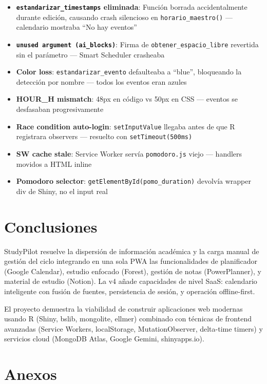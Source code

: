 \documentclass[
  spanish,
  11pt,
  a4paper,
]{article}
\providecommand{\tightlist}{%
  \setlength{\itemsep}{0pt}\setlength{\parskip}{0pt}}
\begin{document}
\begin{itemize}
\tightlist
\item
  \textbf{\texttt{estandarizar\_timestamps} eliminada}: Función borrada
  accidentalmente durante edición, causando crash silencioso en
  \texttt{horario\_maestro()} --- calendario mostraba ``No hay eventos''
\item
  \textbf{\texttt{unused\ argument\ (ai\_blocks)}}: Firma de
  \texttt{obtener\_espacio\_libre} revertida sin el parámetro --- Smart
  Scheduler crasheaba
\item
  \textbf{Color loss}: \texttt{estandarizar\_evento} defaulteaba a
  ``blue'', bloqueando la detección por nombre --- todos los eventos
  eran azules
\item
  \textbf{HOUR\_H mismatch}: 48px en código vs 50px en CSS --- eventos
  se desfasaban progresivamente
\item
  \textbf{Race condition auto-login}: \texttt{setInputValue} llegaba
  antes de que R registrara observers --- resuelto con
  \texttt{setTimeout(500ms)}
\item
  \textbf{SW cache stale}: Service Worker servía \texttt{pomodoro.js}
  viejo --- handlers movidos a HTML inline
\item
  \textbf{Pomodoro selector}:
  \texttt{getElementById(\textquotesingle{}pomo\_duration\textquotesingle{})}
  devolvía wrapper div de Shiny, no el input real
\end{itemize}

\section{Conclusiones}\label{conclusiones}

StudyPilot resuelve la dispersión de información académica y la carga
manual de gestión del ciclo integrando en una sola PWA las
funcionalidades de planificador (Google Calendar), estudio enfocado
(Forest), gestión de notas (PowerPlanner), y material de estudio
(Notion). La v4 añade capacidades de nivel SaaS: calendario inteligente
con fusión de fuentes, persistencia de sesión, y operación
offline-first.

El proyecto demuestra la viabilidad de construir aplicaciones web
modernas usando R (Shiny, bslib, mongolite, ellmer) combinado con
técnicas de frontend avanzadas (Service Workers, localStorage,
MutationObserver, delta-time timers) y servicios cloud (MongoDB Atlas,
Google Gemini, shinyapps.io).

\section{Anexos}\label{anexos}
\end{document}
